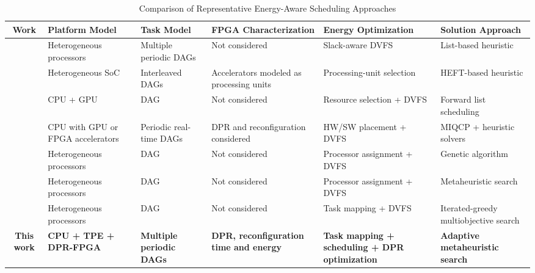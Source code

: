 \documentclass{IEEEtaes}
\begin{document}
\begin{table}[!t]
\caption{Comparison of Representative Energy-Aware Scheduling Approaches}
\begin{center}
\begin{tabularx}{\textwidth}{c|*{5}{>{\centering\arraybackslash}X}}
\hline
\textbf{Work} & \textbf{Platform Model} & \textbf{Task Model} & \textbf{FPGA Characterization} & \textbf{Energy Optimization} & \textbf{Solution Approach} \\
\hline
\cite{b9} & Heterogeneous processors & Multiple periodic DAGs & Not considered & Slack-aware DVFS & List-based heuristic \\
\cite{Mack2022} & Heterogeneous SoC & Interleaved DAGs & Accelerators modeled as processing units & Processing-unit selection & HEFT-based heuristic \\
\cite{Roeder2021} & CPU + GPU & DAG & Not considered & Resource selection + DVFS & Forward list scheduling \\
\cite{Cucinotta2024} & CPU with GPU or FPGA accelerators & Periodic real-time DAGs & DPR and reconfiguration considered & HW/SW placement + DVFS & MIQCP + heuristic solvers \\
\cite{ECGA} & Heterogeneous processors & DAG & Not considered & Processor assignment + DVFS & Genetic algorithm \\
\cite{EHBO} & Heterogeneous processors & DAG & Not considered & Processor assignment + DVFS & Metaheuristic search \\
\cite{METSM} & Heterogeneous processors & DAG & Not considered & Task mapping + DVFS & Iterated-greedy multiobjective search \\
\textbf{This work} & \textbf{CPU + TPE + DPR-FPGA} & \textbf{Multiple periodic DAGs} & \textbf{DPR, reconfiguration time and energy} & \textbf{Task mapping + scheduling + DPR optimization} & \textbf{Adaptive metaheuristic search} \\
\hline
\end{tabularx}
\label{tab:related_work}
\end{center}
\end{table}

\end{document}
